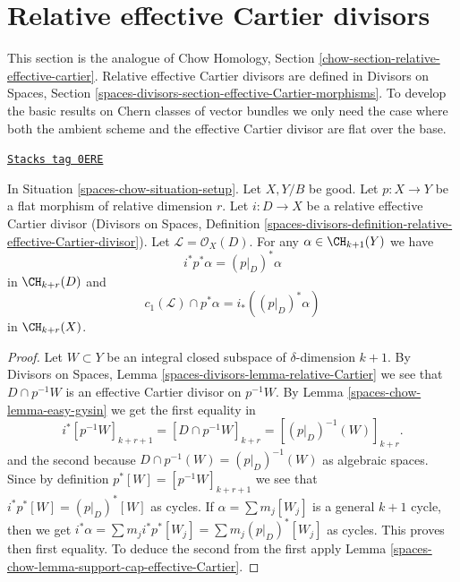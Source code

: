 \section{Relative effective Cartier divisors}
\label{spaces-chow-section-relative-effective-cartier}
This section is the analogue of
Chow Homology, Section \ref{chow-section-relative-effective-cartier}.
Relative effective Cartier divisors are defined
in Divisors on Spaces, Section
\ref{spaces-divisors-section-effective-Cartier-morphisms}.
To develop the basic results on Chern classes of vector bundles
we only need the case where both the ambient scheme and the effective
Cartier divisor are flat over the base.

\begin{lemma}
\label{spaces-chow-lemma-relative-effective-cartier}
\href{https://stacks.math.columbia.edu/tag/0ERE}{\texttt{Stacks tag 0ERE}}

In Situation \ref{spaces-chow-situation-setup}. Let $X, Y/B$ be good.
Let $p : X \to Y$ be a flat morphism of relative dimension $r$.
Let $i : D \to X$ be a relative effective Cartier divisor
(Divisors on Spaces, Definition
\ref{spaces-divisors-definition-relative-effective-Cartier-divisor}).
Let $\mathcal{L} = \mathcal{O}_X(D)$.
For any $\alpha \in \CH_{k + 1}(Y)$ we have
$$
i^*p^*\alpha = (p|_D)^*\alpha
$$
in $\CH_{k + r}(D)$ and
$$
c_1(\mathcal{L}) \cap p^*\alpha = i_* ((p|_D)^*\alpha)
$$
in $\CH_{k + r}(X)$.
\end{lemma}

\begin{proof}
Let $W \subset Y$ be an integral closed subspace of $\delta$-dimension
$k + 1$. By Divisors on Spaces, Lemma
\ref{spaces-divisors-lemma-relative-Cartier}
we see that $D \cap p^{-1}W$ is an effective
Cartier divisor on $p^{-1}W$. By Lemma \ref{spaces-chow-lemma-easy-gysin}
we get the first equality in
$$
i^*[p^{-1}W]_{k + r + 1} =
[D \cap p^{-1}W]_{k + r} =
[(p|_D)^{-1}(W)]_{k + r}.
$$
and the second because $D \cap p^{-1}(W) = (p|_D)^{-1}(W)$ as algebraic spaces.
Since by definition $p^*[W] = [p^{-1}W]_{k + r + 1}$ we see that
$i^*p^*[W] = (p|_D)^*[W]$ as cycles. If $\alpha = \sum m_j[W_j]$ is a
general $k + 1$ cycle, then we get
$i^*\alpha = \sum m_j i^*p^*[W_j] = \sum m_j(p|_D)^*[W_j]$ as cycles.
This proves then first equality. To deduce the second from the
first apply Lemma \ref{spaces-chow-lemma-support-cap-effective-Cartier}.
\end{proof}


